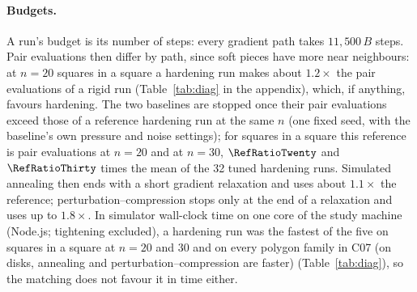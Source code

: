 \paragraph{Budgets.} A run's budget is its number of steps: every gradient path takes $11{,}500\,B$ steps. Pair evaluations then differ by path, since soft pieces have more near neighbours: at $n=20$ squares in a square a hardening run makes about $1.2\times$ the pair evaluations of a rigid run (Table~\ref{tab:diag} in the appendix), which, if anything, favours hardening. The two baselines are stopped once their pair evaluations exceed those of a reference hardening run at the same $n$ (one fixed seed, with the baseline's own pressure and noise settings); for squares in a square this reference is \RefEvalsTwenty{} pair evaluations at $n=20$ and \RefEvalsThirty{} at $n=30$, $\RefRatioTwenty$ and $\RefRatioThirty$ times the mean of the 32 tuned hardening runs. Simulated annealing then ends with a short gradient relaxation and uses about $1.1\times$ the reference; perturbation--compression stops only at the end of a relaxation and uses up to $1.8\times$. In simulator wall-clock time on one core of the study machine (Node.js; tightening excluded), a hardening run was the fastest of the five on squares in a square at $n=20$ and 30 and on every polygon family in C07 (on disks, annealing and perturbation--compression are faster) (Table~\ref{tab:diag}), so the matching does not favour it in time either.

